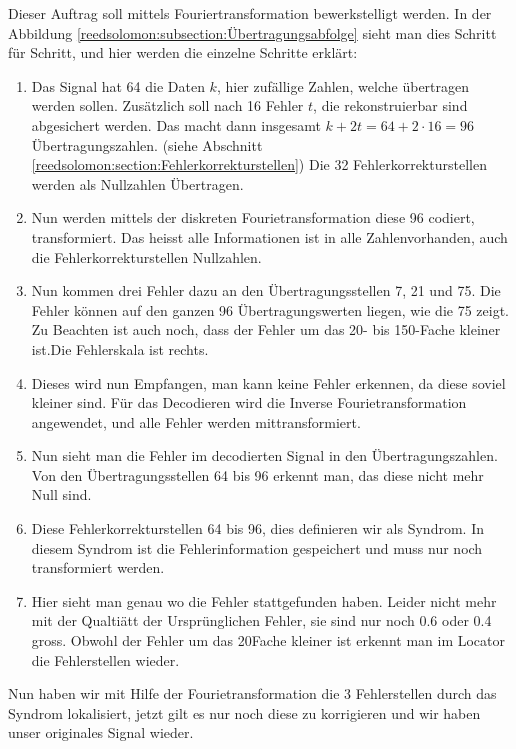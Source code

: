 Dieser Auftrag soll mittels Fouriertransformation bewerkstelligt werden.
In der Abbildung \ref{reedsolomon:subsection:Übertragungsabfolge} sieht man dies Schritt für Schritt,
und hier werden die einzelne Schritte erklärt:
\begin{enumerate}[(1)]
 \item Das Signal hat 64 die Daten $k$, hier zufällige Zahlen, welche übertragen werden sollen. 
 Zusätzlich soll nach 16 Fehler $t$, die rekonstruierbar sind abgesichert werden.
 Das macht dann insgesamt $k + 2t = 
 64 +2 \cdot 16= 96$ Übertragungszahlen.
 (siehe Abschnitt \ref{reedsolomon:section:Fehlerkorrekturstellen})
 Die 32 Fehlerkorrekturstellen werden als Nullzahlen Übertragen.
 \item Nun werden mittels der diskreten Fourietransformation diese 96 codiert, transformiert.
 Das heisst alle Informationen ist in alle Zahlenvorhanden, auch die Fehlerkorrekturstellen Nullzahlen.
 \item Nun kommen drei Fehler dazu an den Übertragungsstellen 7, 21 und 75.
 Die Fehler können auf den ganzen 96 Übertragungswerten liegen, wie die 75 zeigt.
Zu Beachten ist auch noch, dass der Fehler um das 20- bis 150-Fache kleiner ist.Die Fehlerskala ist rechts.
 \item Dieses wird nun Empfangen, man kann keine Fehler erkennen, da diese soviel kleiner sind.
 Für das Decodieren wird die Inverse Fourietransformation angewendet, und alle Fehler werden mittransformiert.
 \item Nun sieht man die Fehler im decodierten Signal in den Übertragungszahlen. 
 Von den Übertragungsstellen 64 bis 96 erkennt man, das diese nicht mehr Null sind.
 \item Diese Fehlerkorrekturstellen 64 bis 96, dies definieren wir als Syndrom.
 In diesem Syndrom ist die Fehlerinformation gespeichert und muss nur noch transformiert werden.
 \item Hier sieht man genau wo die Fehler stattgefunden haben. 
 Leider nicht mehr mit der Qualtiätt der Ursprünglichen Fehler, sie sind nur noch 0.6 oder 0.4 gross.
 Obwohl der Fehler um das 20Fache kleiner ist erkennt man im Locator die Fehlerstellen wieder.
 \end{enumerate}
 Nun haben wir mit Hilfe der Fourietransformation die 3 Fehlerstellen durch das Syndrom lokalisiert, 
 jetzt gilt es nur noch diese zu korrigieren und wir haben unser originales Signal wieder.
